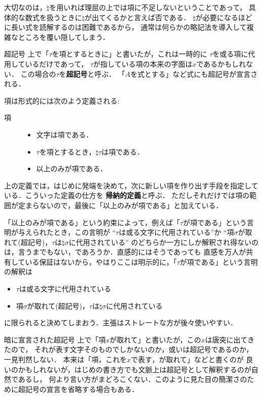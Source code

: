 	大切なのは，$\natural$を用いれば理屈の上では項に不足しないということであって，
	具体的な数式を扱うときに$\natural$が出てくるかと言えば否である．
	$\natural$が必要になるほどに長い式を読解するのは困難であるから，
	通常は何らかの略記法を導入して複雑なところを覆い隠してしまう．
	
	\begin{itembox}[l]{超記号}
		上で「$\tau$を項とするときに」と書いたが，これは一時的に
		$\tau$を或る項に代用しているだけであって，
		$\tau$が指している項の本来の字面は$x$であるかもしれない．
		この場合の$\tau$を{\bf 超記号}と呼ぶ．
		「$A$を式とする」など式にも超記号が宣言される．
	\end{itembox}
	
	項は形式的には次のよう定義される:
	
	\begin{description}
		\item[項]
			\begin{itemize}
				\item 文字は項である．
				\item $\tau$を項とするとき，$\natural \tau$は項である．
				\item 以上のみが項である．
			\end{itemize}
	\end{description}
	
	上の定義では，はじめに発端を決めて，次に新しい項を作り出す手段を指定している．こういった定義の仕方を
	{\bf 帰納的定義}と呼ぶ．
	ただしそれだけでは項の範囲が定まらないので，最後に「以上のみが項である」と加えている．
	
	「以上のみが項である」という約束によって，例えば「$\tau$が項である」という言明が与えられたとき，この言明が
	``$\tau$は或る文字に代用されている''か
	``項$\sigma$が取れて(超記号)，$\tau$は$\natural \sigma$に代用されている''
	のどちらか一方にしか解釈され得ないのは，言うまでもない，であろうか．直感的にはそうであっても
	直感を万人が共有している保証はないから，やはりここは明示的に，「$\tau$が項である」という言明の解釈は
	\begin{itemize}
		\item $\tau$は或る文字に代用されている
		\item 項$\sigma$が取れて(超記号)，$\tau$は$\natural \sigma$に代用されている
	\end{itemize}
	に限られると決めてしまおう．主張はストレートな方が後々使いやすい．
	
	\begin{itembox}[l]{暗に宣言された超記号}
		上で「項$x$が取れて」と書いたが，この$x$は唐突に出てきたので，
		それが表す文字そのものでしかないのか，或いは超記号であるのか，一見判然しない．
		本来は「項，これを$x$で表す，が取れて」などと書くのが
		良いのかもしれないが，はじめの書き方でも文脈上は超記号として解釈するのが自然であるし，
		何より言い方がまどろこくない．このように見た目の簡潔さのために超記号の宣言を省略する場合もある．
	\end{itembox}
	
